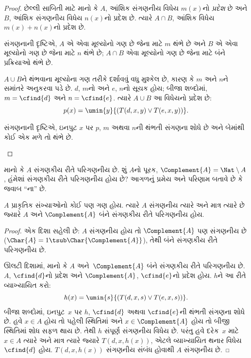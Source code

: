 \begin{proof}
છેલ્લી સાબિતી માટે માનો કે $A$, આંશિક સંગણનીય વિધેય $m(x)$નો
\emph{પ્રદેશ} છે અને $B$, આંશિક સંગણનીય વિધેય $n(x)$નો પ્રદેશ છે.
ત્યારે $A \cap B$, આંશિક વિધેય $m(x) + n(x)$નો પ્રદેશ છે.

\begin{explain}
સંગણનાની દૃષ્ટિએ, $A$ એ એવા મૂલ્યોનો ગણ છે જેના માટે
$m$ થંભે છે અને $B$ એ એવા મૂલ્યોનો ગણ છે જેના માટે
$n$ થંભે છે; $A \cap B$ એવા મૂલ્યોનો ગણ છે જેના માટે
બંને પ્રક્રિયાઓ થંભે છે.
\end{explain}

$A \cup B$ને થંભવાના મૂલ્યોના ગણ તરીકે દર્શાવવું વધુ
મુશ્કેલ છે, કારણ કે $m$ અને $n$ને સમાંતરે અનુકરવા પડે છે.
$d$, $m$નો અને $e$, $n$નો સૂચક હોય; બીજા શબ્દોમાં,
$m = \cfind{d}$ અને $n = \cfind{e}$. ત્યારે $A \cup B$
આ વિધેયનો પ્રદેશ છે:
\[
p(x) = \umin{y}{(T(d,x,y) \lor T(e,x,y))}.
\]
\begin{explain}
સંગણનાની દૃષ્ટિએ, ઇનપુટ $x$ પર $p$, $m$ અથવા $n$ની
થંભતી સંગણના શોધે છે અને બેમાંથી કોઈ એક મળે તો થંભે છે.
\end{explain}
\end{proof}
\endgroup


\begingroup
\makeatletter{}\makeatother

\label{guunit:OLP-0242}


માનો કે $A$ સંગણકીય રીતે પરિગણનીય છે. શું $A$નો પૂરક,
$\Complement{A} = \Nat \setminus A$, હંમેશાં સંગણકીય રીતે
પરિગણનીય હોય છે? આગળનું પ્રમેય અને પરિણામ બતાવે છે કે
જવાબ ``ના'' છે.

\begin{thm}
$A$ પ્રાકૃતિક સંખ્યાઓનો કોઈ પણ ગણ હોય. ત્યારે $A$ સંગણનીય
ત્યારે અને માત્ર ત્યારે છે જ્યારે $A$ અને $\Complement{A}$
બંને સંગણકીય રીતે પરિગણનીય હોય.
\end{thm}

\begin{proof}
એક દિશા સહેલી છે: $A$ સંગણનીય હોય તો $\Complement{A}$ પણ
સંગણનીય છે ($\Char{A} = 1 \tsub
\Char{\Complement{A}}$), તેથી બંને સંગણકીય રીતે પરિગણનીય છે.

ઊલટી દિશામાં, માનો કે $A$ અને~$\Complement{A}$ બંને
સંગણકીય રીતે પરિગણનીય છે. $A$, $\cfind{d}$નો પ્રદેશ
અને $\Complement{A}$, $\cfind{e}$નો પ્રદેશ હોય. $h$ને
આ રીતે વ્યાખ્યાયિત કરો:
\[
h(x) = \umin{s}{(T(d,x,s) \lor T(e,x,s))}.
\]
બીજા શબ્દોમાં, ઇનપુટ~$x$ પર $h$, $\cfind{d}$ અથવા
$\cfind{e}$ની થંભતી સંગણના શોધે છે. હવે $x \in A$ હોય
તો પહેલી સ્થિતિમાં અને $x \in \Complement{A}$ હોય તો
બીજી સ્થિતિમાં શોધ સફળ થાય છે. તેથી $h$ સંપૂર્ણ સંગણનીય
વિધેય છે. પરંતુ હવે દરેક~$x$ માટે $x \in A$ ત્યારે અને
માત્ર ત્યારે જ્યારે $T(d, x, h(x))$, એટલે વ્યાખ્યાયિત
થનાર વિધેય $\cfind{d}$ હોય. $T(d, x, h(x))$ સંગણનીય
સંબંધ હોવાથી $A$ સંગણનીય છે.
\end{proof}

